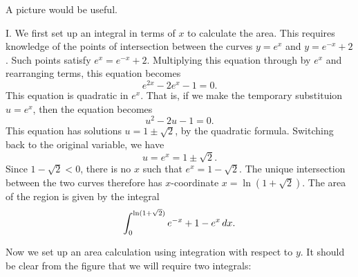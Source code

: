 \documentclass[]{ximera}
\begin{document}
\begin{freeResponse}
A picture would be useful.
\begin{image}
\end{image}

I. We first set up an integral in terms of $x$ to calculate the area. This requires knowledge of the points of intersection between the curves $y=e^x$ and $y=e^{-x} +2$. Such points satisfy $e^x = e^{-x} +2$. Multiplying this equation through by $e^x$ and rearranging terms, this equation becomes
$$
e^{2x} - 2e^x -1 =0.
$$
This equation is quadratic in $e^x$. That is, if we make the temporary substituion $u=e^x$, then the equation becomes
$$
u^2 - 2u - 1 = 0.
$$
This equation has solutions $u = 1 \pm \sqrt{2}$, by the quadratic formula. Switching back to the original variable, we have
$$
u = e^x = 1 \pm \sqrt{2}.
$$
Since $1-\sqrt{2} < 0$, there is no $x$ such that $e^x = 1-\sqrt{2}$. The unique intersection between the two curves therefore has $x$-coordinate $x = \ln(1+ \sqrt{2})$. The area of the region is given by the integral
$$
\int_0^{\ln (1+ \sqrt{2})} e^{-x}+1-e^x \mathop{}\!d x.
$$

Now we set up an area calculation using integration with respect to $y$. It should be clear from the figure that we will require two integrals:


\end{freeResponse}
\end{document}
